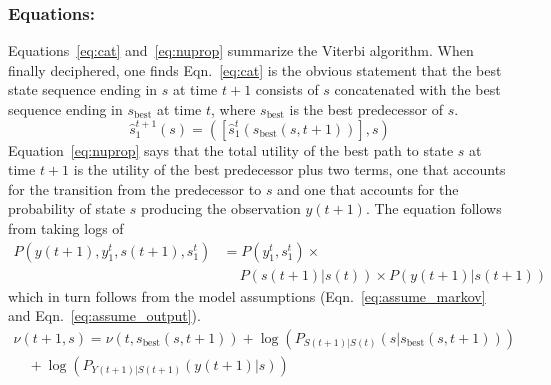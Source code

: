 \documentclass[]{article}
\newcommand{\ts}[3]{#1_{#2}^{#3}}                    %
\newcommand{\ti}[2]{{#1}{(#2)}}                  %
\newcommand{\sbest}{s_{\text{best}}}
\begin{document}
\subsubsection*{Equations:}
Equations~\eqref{eq:cat} and~\eqref{eq:nuprop} summarize the Viterbi
algorithm.  When finally deciphered, one finds Eqn.~\eqref{eq:cat} is
the obvious statement that the best state sequence ending in $s$ at
time $t+1$ consists of $s$ concatenated with the best sequence ending
in $\sbest$ at time $t$, where $\sbest$ is the best predecessor of $s$.
\begin{equation}
  \label{eq:cat}
  \ts{\hat s}{1}{t+1} (s) = \left( \left[\ts{\hat s}{1}{t}
      (\sbest(s,t+1))\right],s \right)
\end{equation}
Equation~\eqref{eq:nuprop} says that the total utility of the best
path to state $s$ at time $t+1$ is the utility of the best
predecessor plus two terms, one that accounts for the transition from
the predecessor to $s$ and one that accounts for the probability of
state $s$ producing the observation $\ti{y}{t+1}$.  The equation
follows from taking logs of
\begin{align*}
  P\left(\ti{y}{t+1},\ts{y}{1}{t},\ti{s}{t+1},\ts{s}{1}{t} \right) &=
  P\left(\ts{y}{1}{t}, \ts{s}{1}{t} \right) \times \\
  & \quad ~ P \left(\ti{s}{t+1}|\ti{s}{t} \right) \times
  P\left(\ti{y}{t+1}|\ti{s}{t+1} \right)
\end{align*}
which in turn follows from the model assumptions
(Eqn.~\eqref{eq:assume_markov} and Eqn.~\eqref{eq:assume_output}).
\begin{equation}
  \label{eq:nuprop}
  \begin{split}
    \nu (t+1,s) = \nu(t,\sbest(s,t+1)) +
    \log\left(P_{\ti{S}{t+1}|\ti{S}{t}} \left(s|\sbest(s,t+1) \right)\right)\\
    \quad + \log \left( P_{\ti{Y}{t+1}|\ti{S}{t+1}}
      \left(\ti{y}{t+1}|s\right)\right)
  \end{split}
\end{equation}
\end{document}
